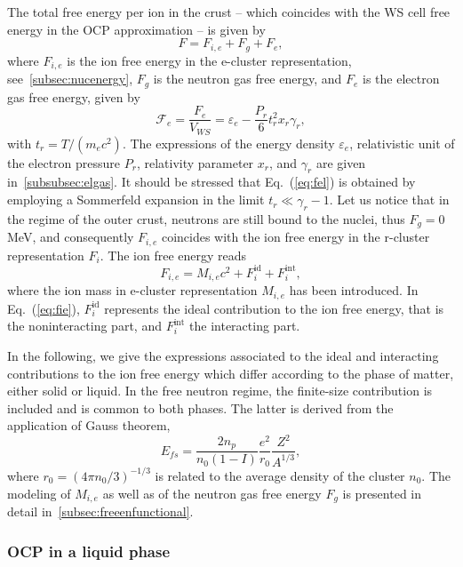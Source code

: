 The total free energy per ion in the crust -- which coincides with the WS cell
free energy in the OCP approximation -- is given by
%
\begin{equation}
  F = F_{i,e} + F_g + F_e,\label{eq:fperion}
\end{equation}
%
where $F_{i,e}$ is the ion free energy in the e-cluster representation, 
see~\ref{subsec:nucenergy}, $F_g$ is the neutron gas free energy, and $F_e$ 
is the electron gas free energy, given by~\cite{Haensel2007}
%
\begin{equation}
  \mathcal{F}_e = \frac{F_e}{V_{WS}} = \varepsilon_e -
  \frac{P_r}{6}t_r^2x_r\gamma_r,\label{eq:fel}
\end{equation}
%
with $t_r = T/(m_e c^2)$. The expressions of the energy density 
$\varepsilon_e$, relativistic unit of the electron pressure $P_r$, relativity
parameter $x_r$, and $\gamma_r$ are given in~\ref{subsubsec:elgas}. It should
be stressed that Eq.~(\ref{eq:fel}) is obtained by employing a Sommerfeld
expansion in the limit $t_r \ll \gamma_r - 1$.
Let us notice that in the regime of the outer crust, neutrons are still bound
to the nuclei, thus $F_g=0$ MeV, and consequently $F_{i,e}$ coincides with the 
ion free energy in the r-cluster representation $F_i$.
The ion free energy reads
%
\begin{equation}
  F_{i,e} = M_{i,e} c^2 + F_i^{\text{id}} + F_i^{\text{int}},\label{eq:fie}
\end{equation}
%
where the ion mass in e-cluster representation $M_{i,e}$ has been introduced.
In Eq.~(\ref{eq:fie}), $F_i^{\text{id}}$ represents the ideal contribution to
the ion free energy, that is the noninteracting part, and $F_i^{\text{int}}$
the interacting part.

In the following, we give the expressions associated to the ideal and 
interacting contributions to the ion free energy which differ according to the 
phase of matter, either solid or liquid. In the free neutron regime, the 
finite-size contribution is included and is common to both phases. The latter 
is derived from the application of Gauss theorem,
%
\begin{equation}
  E_{fs} = \frac{2n_p}{n_0(1-I)}\frac{e^2}{r_0}\frac{Z^2}{A^{1/3}},
\end{equation}
%
where $r_0=(4\pi n_0/3)^{-1/3}$ is related to the average density of the
cluster $n_0$.
The modeling of $M_{i,e}$ as well as of the neutron gas free energy $F_g$ is 
presented in detail in~\ref{subsec:freeenfunctional}. 

\subsubsection{OCP in a liquid phase}

